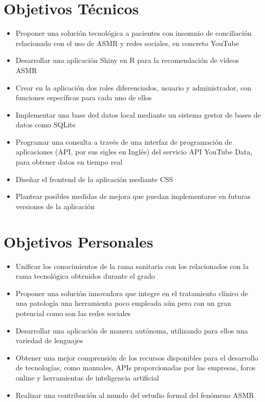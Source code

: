 \documentclass[a4paper,12pt,twoside]{memoir}
\begin{document}
\section{Objetivos Técnicos}
\begin{itemize}
    \item Proponer una solución tecnológica a pacientes con insomnio de conciliación relacionado con el uso de ASMR y redes sociales, en concreto YouTube
    \item Desarrollar una aplicación Shiny en R para la recomendación de vídeos ASMR
    \item Crear en la aplicación dos roles diferenciados, usuario y administrador, con funciones específicas para cada uno de ellos
    \item Implementar una base ded datos local mediante un sistema gestor de bases de datos como SQLite
    \item  Programar una consulta a través de una interfaz de programación de aplicaciones (API, por sus sigles en Inglés) del servicio API YouTube Data, para obtener datos en tiempo real
    \item Diseñar el frontend de la aplicación mediante CSS
    \item Plantear posibles medidas de mejora que puedan implementarse en futuras versiones de la aplicación
    
\end{itemize}

\section{Objetivos Personales}
\begin{itemize}
    \item Unificar los conocimientos de la rama sanitaria con los relacionados con la rama tecnológica obtenidos durante el grado
    \item Proponer una solución innovadora que integre en el tratamiento clínico de una patología una herramienta poco empleada aún pero con un gran potencial como son las redes sociales
    \item Desarrollar una aplicación de manera autónoma, utilizando para ellos una variedad de lenguajes
    \item Obtener una mejor comprensión de los recursos disponibles para el desarrollo de tecnologías, como manuales, APIs proporcionadas por las empresas, foros online y herramientas de inteligencia artificial
    \item Realizar una contribución al mundo del estudio formal del fenómeno ASMR
\end{itemize}
\end{document}
